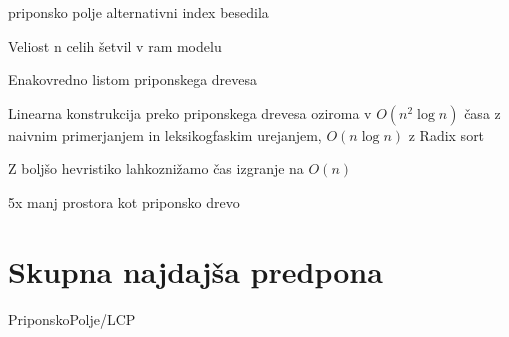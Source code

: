 priponsko polje alternativni index besedila

Veliost n celih šetvil v ram modelu

Enakovredno listom priponskega drevesa

Linearna konstrukcija preko priponskega drevesa oziroma v $O(n^2\log{n})$ časa z naivnim primerjanjem in leksikogfaskim urejanjem,  $O(n\log{n})$ z Radix sort

Z boljšo hevristiko lahkoznižamo čas izgranje na $O(n)$ \cite{Nong2009}



5x manj prostora kot priponsko drevo\cite{Manber1990}

\cite{Manber1990}

\section{Skupna najdajša predpona}\label{sec:LCP}
{PriponskoPolje/LCP}
